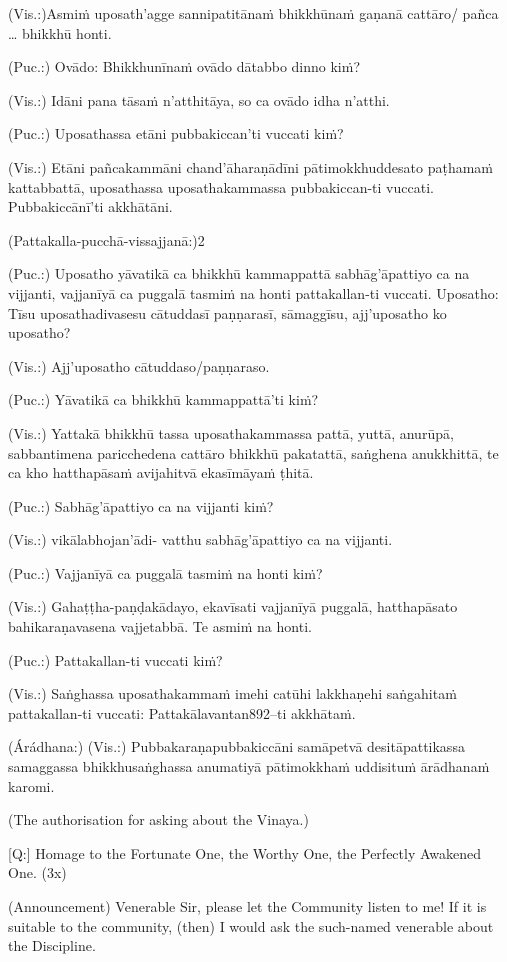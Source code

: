 (Vis.:)Asmiṁ uposath'agge sannipatitānaṁ bhikkhūnaṁ gaṇanā cattāro/
pañca … bhikkhū honti.

(Puc.:) Ovādo: Bhikkhunīnaṁ ovādo dātabbo dinno kiṁ?

(Vis.:) Idāni pana tāsaṁ n'atthitāya, so ca ovādo idha n'atthi.

(Puc.:) Uposathassa etāni pubbakiccan'ti vuccati kiṁ?

(Vis.:) Etāni pañcakammāni chand'āharaṇādīni pātimokkhuddesato
paṭhamaṁ kattabbattā, uposathassa uposathakammassa pubbakiccan-ti
vuccati. Pubbakiccānī'ti akkhātāni.

(Pattakalla-pucchā-vissajjanā:)2

(Puc.:) Uposatho yāvatikā ca bhikkhū kammappattā sabhāg'āpattiyo ca na
vijjanti, vajjanīyā ca puggalā tasmiṁ na honti pattakallan-ti vuccati.
Uposatho: Tīsu uposathadivasesu cātuddasī paṇṇarasī, sāmaggīsu,
ajj'uposatho ko uposatho?

(Vis.:) Ajj'uposatho cātuddaso/paṇṇaraso.

(Puc.:) Yāvatikā ca bhikkhū kammappattā'ti kiṁ?

(Vis.:) Yattakā bhikkhū tassa uposathakammassa pattā, yuttā, anurūpā,
sabbantimena paricchedena cattāro bhikkhū pakatattā, saṅghena
anukkhittā, te ca kho hatthapāsaṁ avijahitvā ekasīmāyaṁ ṭhitā.

(Puc.:) Sabhāg'āpattiyo ca na vijjanti kiṁ?

(Vis.:) vikālabhojan'ādi- vatthu sabhāg'āpattiyo ca na vijjanti.

(Puc.:) Vajjanīyā ca puggalā tasmiṁ na honti kiṁ?

(Vis.:) Gahaṭṭha-paṇḍakādayo, ekavīsati vajjanīyā puggalā, hatthapāsato
bahikaraṇavasena vajjetabbā. Te asmiṁ na honti.

(Puc.:) Pattakallan-ti vuccati kiṁ?

(Vis.:) Saṅghassa uposathakammaṁ imehi catūhi lakkhaṇehi saṅgahitaṁ
pattakallan-ti vuccati: Pattakālavantan892–ti akkhātaṁ.

(Árádhana:)
(Vis.:) Pubbakaraṇapubbakiccāni samāpetvā desitāpattikassa samaggassa
bhikkhusaṅghassa anumatiyā pātimokkhaṁ uddisituṁ ārādhanaṁ
karomi.

\clearpage

(The authorisation for asking about the Vinaya.)

[Q:] Homage to the Fortunate One, the Worthy One, the Perfectly
Awakened One. (3x)

(Announcement)
Venerable Sir, please let the Community listen to me! If it is suitable
to the community, (then) I would ask the such-named venerable
about the Discipline.

